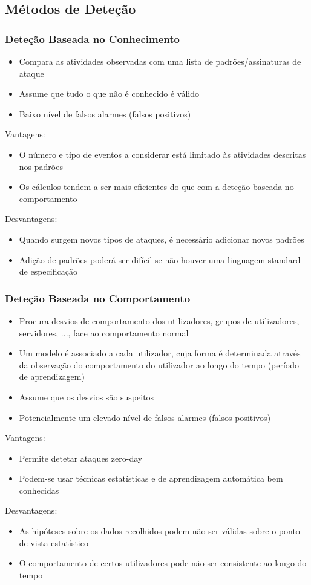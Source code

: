 \documentclass[10pt,a4paper]{report}
\begin{document}
\subsection{Métodos de Deteção}
\subsubsection{Deteção Baseada no Conhecimento}
\begin{itemize}
\item Compara as atividades observadas com uma lista de padrões/assinaturas de ataque
\item Assume que tudo o que não é conhecido é válido
\item Baixo nível de falsos alarmes (falsos positivos)
\end{itemize}
Vantagens:
\begin{itemize}
\item O número e tipo de eventos a considerar está limitado às atividades descritas nos padrões
\item Os cálculos tendem a ser mais eficientes do que com a deteção baseada no comportamento
\end{itemize}
Desvantagens:
\begin{itemize}
\item Quando surgem novos tipos de ataques, é necessário adicionar novos padrões
\item Adição de padrões poderá ser difícil se não houver uma linguagem standard de especificação
\end{itemize}
\subsubsection{Deteção Baseada no Comportamento}
\begin{itemize}
\item Procura desvios de comportamento dos utilizadores, grupos de utilizadores, servidores, ..., face ao comportamento normal
\item Um modelo é associado a cada utilizador, cuja forma é determinada através da observação do comportamento do utilizador ao longo do tempo (período de aprendizagem)
\item Assume que os desvios são suspeitos
\item Potencialmente um elevado nível de falsos alarmes (falsos positivos)
\end{itemize}
Vantagens:
\begin{itemize}
\item Permite detetar ataques zero-day
\item Podem-se usar técnicas estatísticas e de aprendizagem automática bem conhecidas
\end{itemize}
Desvantagens:
\begin{itemize}
\item As hipóteses sobre os dados recolhidos podem não ser válidas sobre o ponto de vista
estatístico
\item O comportamento de certos utilizadores pode não ser consistente ao longo do tempo
\end{itemize}
\end{document}
